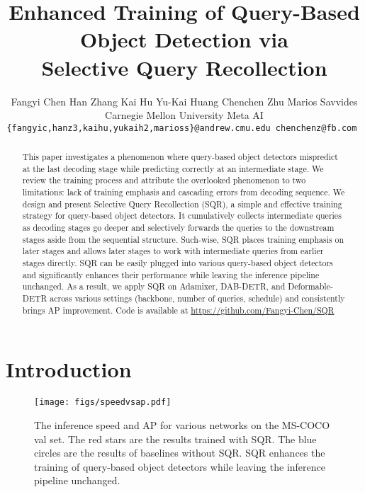\documentclass[10pt,twocolumn,letterpaper]{article}
\begin{document}
\title{Enhanced Training of Query-Based Object Detection via \\ Selective Query Recollection}

\author{Fangyi Chen \quad Han Zhang \quad Kai Hu \quad Yu-Kai Huang \quad Chenchen Zhu \quad Marios Savvides\\
Carnegie Mellon University \qquad Meta AI\\
{\tt\small \{fangyic,hanz3,kaihu,yukaih2,marioss\}@andrew.cmu.edu \quad chenchenz@fb.com }
}
\maketitle



\begin{abstract}
    This paper investigates a phenomenon where query-based object detectors mispredict at the last decoding stage while predicting correctly at an intermediate stage. We review the training process and attribute the overlooked phenomenon to two limitations: 
    lack of training emphasis and cascading errors from decoding sequence.
    We design and present Selective Query Recollection (SQR), a simple and effective training strategy for query-based object detectors. 
    It cumulatively collects intermediate queries as decoding stages go deeper and selectively forwards the queries to the downstream stages aside from the sequential structure. 
    Such-wise, SQR places training emphasis on later stages and allows later stages to work with intermediate queries from earlier stages directly. SQR can be easily plugged into various query-based object detectors and significantly enhances their performance while leaving the inference pipeline unchanged. As a result, we apply SQR on Adamixer, DAB-DETR, and Deformable-DETR across various settings (backbone, number of queries, schedule) and consistently brings  AP improvement. Code is available at \url{https://github.com/Fangyi-Chen/SQR}
\end{abstract}

\section{Introduction}
\label{sec:intro}

\begin{figure}
    \centering
    \texttt{[image: figs/speedvsap.pdf]}
    \caption{The inference speed and AP for various networks on the MS-COCO val set. The red stars are the results trained with SQR. The blue circles are the results of baselines without SQR. SQR enhances the training of query-based object detectors while leaving the inference pipeline unchanged.}
    \label{fig:speedvsap}
\end{figure}
\end{document}
